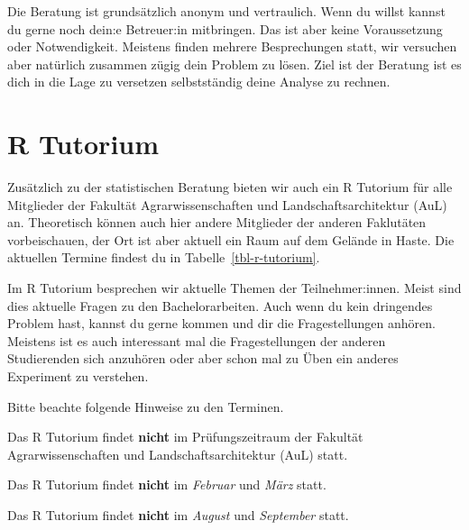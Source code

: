 \documentclass[
  letterpaper,
]{scrbook}
\begin{document}
Die Beratung ist grundsätzlich anonym und vertraulich. Wenn du willst
kannst du gerne noch dein:e Betreuer:in mitbringen. Das ist aber keine
Voraussetzung oder Notwendigkeit. Meistens finden mehrere Besprechungen
statt, wir versuchen aber natürlich zusammen zügig dein Problem zu
lösen. Ziel ist der Beratung ist es dich in die Lage zu versetzen
selbstständig deine Analyse zu rechnen.

\hypertarget{sec-r-tutorium}{%
\section{R Tutorium}\label{sec-r-tutorium}}

Zusätzlich zu der statistischen Beratung bieten wir auch ein R Tutorium
für alle Mitglieder der Fakultät Agrarwissenschaften und
Landschaftsarchitektur (AuL) an. Theoretisch können auch hier andere
Mitglieder der anderen Faklutäten vorbeischauen, der Ort ist aber
aktuell ein Raum auf dem Gelände in Haste. Die aktuellen Termine findest
du in Tabelle~\ref{tbl-r-tutorium}.

Im R Tutorium besprechen wir aktuelle Themen der Teilnehmer:innen. Meist
sind dies aktuelle Fragen zu den Bachelorarbeiten. Auch wenn du kein
dringendes Problem hast, kannst du gerne kommen und dir die
Fragestellungen anhören. Meistens ist es auch interessant mal die
Fragestellungen der anderen Studierenden sich anzuhören oder aber schon
mal zu Üben ein anderes Experiment zu verstehen.

Bitte beachte folgende Hinweise zu den Terminen.

\begin{tcolorbox}[enhanced jigsaw, coltitle=black, titlerule=0mm, bottomrule=.15mm, opacityback=0, opacitybacktitle=0.6, leftrule=.75mm, title=\textcolor{quarto-callout-note-color}{\faInfo}\hspace{0.5em}{Hinweise zu dem R Tutorium}, toprule=.15mm, bottomtitle=1mm, toptitle=1mm, left=2mm, breakable, arc=.35mm, colback=white, rightrule=.15mm, colbacktitle=quarto-callout-note-color!10!white, colframe=quarto-callout-note-color-frame]
Das R Tutorium findet \textbf{nicht} im Prüfungszeitraum der Fakultät
Agrarwissenschaften und Landschaftsarchitektur (AuL) statt.

Das R Tutorium findet \textbf{nicht} im \emph{Februar} und \emph{März}
statt.

Das R Tutorium findet \textbf{nicht} im \emph{August} und
\emph{September} statt.
\end{tcolorbox}
\end{document}
